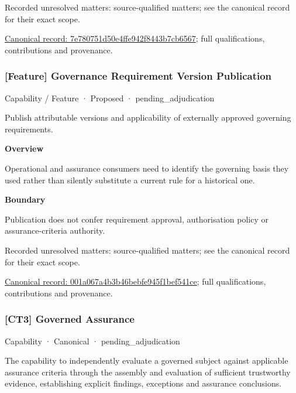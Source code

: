 {\small Recorded unresolved matters: source-qualified matters; see the canonical record for their exact scope.}\par
{\footnotesize \href{../../../../continuum/strategy/capability/7e780751d50e4ffe942f8443b7cb6567.md}{Canonical record: 7e780751d50e4ffe942f8443b7cb6567}; full qualifications, contributions and provenance.}\par
\subsubsection{[Feature] Governance Requirement Version Publication}

\label{element:001a067a4b3b46bebfe945f1bef541ce}
{\small Capability / Feature · Proposed · pending\_adjudication}\par

Publish attributable versions and applicability of externally approved governing requirements.



\textbf{Overview}



Operational and assurance consumers need to identify the governing basis they used rather than silently substitute a current rule for a historical one.



\textbf{Boundary}



Publication does not confer requirement approval, authorisation policy or assurance-criteria authority.


{\small Recorded unresolved matters: source-qualified matters; see the canonical record for their exact scope.}\par
{\footnotesize \href{../../../../continuum/strategy/capability/feature/001a067a4b3b46bebfe945f1bef541ce.md}{Canonical record: 001a067a4b3b46bebfe945f1bef541ce}; full qualifications, contributions and provenance.}\par
\subsubsection{[CT3] Governed Assurance}

\label{element:da1a983d4dcf4d5bb772b8f69bc08426}
{\small Capability · Canonical · pending\_adjudication}\par

The capability to independently evaluate a governed subject against applicable assurance criteria through the assembly and evaluation of sufficient trustworthy evidence, establishing explicit findings, exceptions and assurance conclusions.



